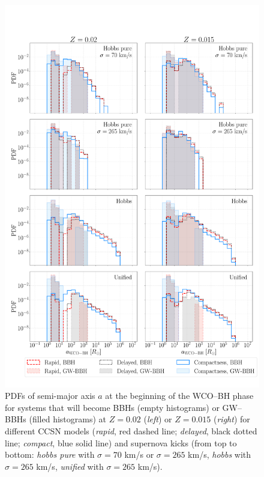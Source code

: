 \documentclass[a4paper,titlepage]{book}     	%
\begin{document}
\begin{appendices}
\begin{figure}
	\centering
	\includegraphics[width=\textwidth]{./images/WRBH-apureHe.pdf}	
	\caption{PDFs of semi-major axis $a$ at the beginning of the WCO--BH phase for systems that will become BBHs (empty histograms) or GW--BBHs (filled histograms) at $Z=0.02$ (\emph{left}) or $Z=0.015$ (\emph{right}) for different CCSN models (\emph{rapid}, red dashed line; \emph{delayed}, black dotted line; \emph{compact}, blue solid line) and supernova kicks (from top to bottom: \emph{hobbs pure} with $\sigma = 70$ km/s or $\sigma = 265$ km/s, \emph{hobbs} with $\sigma = 265$ km/s, \emph{unified} with $\sigma = 265$ km/s).}\label{fig:resultsWRBH-apureHe}
\end{figure}


\end{appendices}
\end{document}
